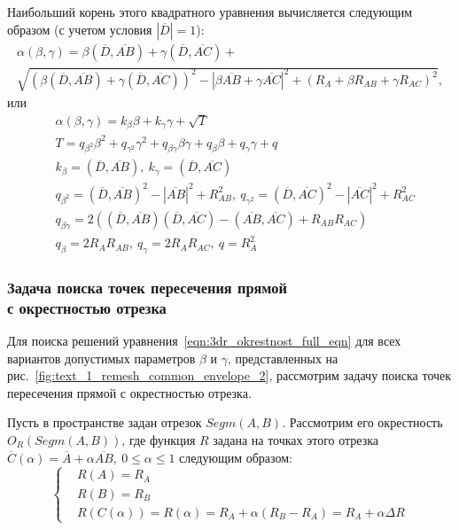 Наибольший корень этого квадратного уравнения вычисляется следующим образом (с учетом условия $|\overline{D}| = 1$):
\begin{multline}
	\alpha(\beta, \gamma) = \beta (\overline{D}, \overline{AB}) + \gamma (\overline{D}, \overline{AC}) + \\
	\sqrt{(\beta (\overline{D}, \overline{AB}) + \gamma (\overline{D}, \overline{AC}))^2 - |\beta \overline{AB} + \gamma \overline{AC}|^2 + (R_A + \beta R_{AB} + \gamma R_{AC})^2},
\end{multline}
или
\begin{equation}\label{eqn:3dr_okrestnost_full_eqn}
	\begin{aligned}
		& \alpha(\beta, \gamma) = k_{\beta} \beta + k_{\gamma} \gamma + \sqrt{T} \\
		& T = q_{\beta^2} \beta^2 + q_{\gamma^2} \gamma^2 + q_{\beta \gamma} \beta \gamma + q_{\beta} \beta + q_{\gamma} \gamma + q \\
		& k_{\beta} = (\overline{D}, \overline{AB}), \ k_{\gamma} = (\overline{D}, \overline{AC}) \\
		& q_{\beta^2} = (\overline{D}, \overline{AB})^2 - |\overline{AB}|^2 + R_{AB}^2, \ q_{\gamma^2} = (\overline{D}, \overline{AC})^2 - |\overline{AC}|^2 + R_{AC}^2 \\
		& q_{\beta \gamma} = 2 \left( (\overline{D}, \overline{AB}) (\overline{D}, \overline{AC}) - (\overline{AB}, \overline{AC}) + R_{AB}R_{AC} \right) \\
		& q_{\beta} = 2 R_A R_{AB}, \ q_{\gamma} = 2 R_A R_{AC}, \ q = R_A^2
	\end{aligned}
\end{equation}

\subsubsection{Задача поиска точек пересечения прямой \\ с окрестностью отрезка}\label{sec:text_1_geo_prim_line_eps_intersect}

Для поиска решений уравнения~\eqref{eqn:3dr_okrestnost_full_eqn} для всех вариантов допустимых параметров $\beta$ и $\gamma$, представленных на рис.~\ref{fig:text_1_remesh_common_envelope_2}, рассмотрим задачу поиска точек пересечения прямой с окрестностью отрезка.

Пусть в пространстве задан отрезок $Segm(A, B)$.
Рассмотрим его окрестность $O_R(Segm(A, B))$, где функция $R$ задана на точках этого отрезка $\overline{C}(\alpha) = \overline{A} + \alpha \overline{AB}, \ 0 \le \alpha \le 1$ следующим образом:
\begin{equation}
	\left\{
		\begin{aligned}
			& R(A) = R_A \\
			& R(B) = R_B \\
			& R(C(\alpha)) = R(\alpha) = R_A + \alpha (R_B - R_A) = R_A + \alpha \Delta R
		\end{aligned}
	\right.
\end{equation}

